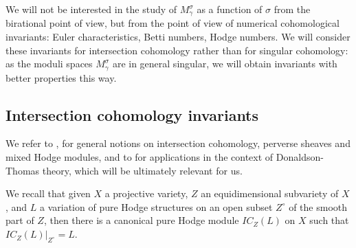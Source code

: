 \documentclass[12pt, a4paper]{amsart}
\begin{document}
We will not be interested in the study of $M_\gamma^\sigma$ as a function of $\sigma$ from the birational point of
view, but from the point of view of numerical cohomological invariants:
Euler characteristics, Betti numbers, Hodge numbers. We will consider these
invariants for intersection cohomology rather than for singular cohomology:
as the moduli spaces $M_\gamma^\sigma$ are in general singular, we will obtain invariants with better properties this way.

\subsection{Intersection cohomology invariants}
\label{section_intersection_invariants}

We refer to \cite{MR751966, MR2525735, MR1047415}, for general notions on intersection cohomology, perverse sheaves and mixed Hodge modules, and to \cite{meinhardt2017donaldson, meinhardt2015donaldson}
for applications in the context of Donaldson-Thomas theory, which will be ultimately relevant for us.

We recall that given $X$ a projective variety, $Z$ an equidimensional subvariety of
$X$, and $L$ a variation of pure Hodge structures on an open subset $Z^\circ$
of the smooth part of $Z$, then there is a canonical pure Hodge module 
$IC_Z(L)$ on $X$ such that $IC_Z(L)|_{Z^\circ}= L$.
\end{document}
